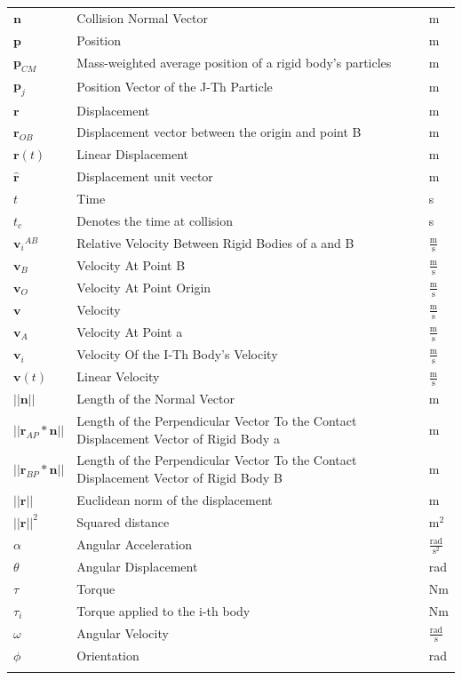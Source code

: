 \documentclass[12pt]{article}
\begin{document}
\begin{longtabu}{l X[l] l}
\\
$\mathbf{n}$ & Collision Normal Vector & m
\\
$\mathbf{p}$ & Position & m
\\
${\mathbf{p}_{CM}}$ & Mass-weighted average position of a rigid body's particles & m
\\
${\mathbf{p}_{j}}$ & Position Vector of the J-Th Particle & m
\\
$\mathbf{r}$ & Displacement & m
\\
${\mathbf{r}_{OB}}$ & Displacement vector between the origin and point B & m
\\
$\mathbf{r}(t)$ & Linear Displacement & m
\\
$\mathbf{\hat{r}}$ & Displacement unit vector & m
\\
$t$ & Time & s
\\
${t_{c}}$ & Denotes the time at collision & s
\\
${{\mathbf{v}_{i}}^{AB}}$ & Relative Velocity Between Rigid Bodies of a and B & $\frac{\text{m}}{\text{s}}$
\\
${\mathbf{v}_{B}}$ & Velocity At Point B & $\frac{\text{m}}{\text{s}}$
\\
${\mathbf{v}_{O}}$ & Velocity At Point Origin & $\frac{\text{m}}{\text{s}}$
\\
$\mathbf{v}$ & Velocity & $\frac{\text{m}}{\text{s}}$
\\
${\mathbf{v}_{A}}$ & Velocity At Point a & $\frac{\text{m}}{\text{s}}$
\\
${\mathbf{v}_{i}}$ & Velocity Of the I-Th Body's Velocity & $\frac{\text{m}}{\text{s}}$
\\
$\mathbf{v}(t)$ & Linear Velocity & $\frac{\text{m}}{\text{s}}$
\\
$||\mathbf{n}||$ & Length of the Normal Vector & m
\\
$||{\mathbf{r}_{AP}}*\mathbf{n}||$ & Length of the Perpendicular Vector To the Contact Displacement Vector of Rigid Body a & m
\\
$||{\mathbf{r}_{BP}}*\mathbf{n}||$ & Length of the Perpendicular Vector To the Contact Displacement Vector of Rigid Body B & m
\\
$||\mathbf{r}||$ & Euclidean norm of the displacement & m
\\
${||\mathbf{r}||^{2}}$ & Squared distance & $\text{m}^{2}$
\\
$α$ & Angular Acceleration & $\frac{\text{rad}}{\text{s}^{2}}$
\\
$θ$ & Angular Displacement & rad
\\
$τ$ & Torque & Nm
\\
${τ_{i}}$ & Torque applied to the i-th body & Nm
\\
$ω$ & Angular Velocity & $\frac{\text{rad}}{\text{s}}$
\\
$ϕ$ & Orientation & rad
\\
\bottomrule
\label{Table:ToS}
\end{longtabu}
\end{document}
